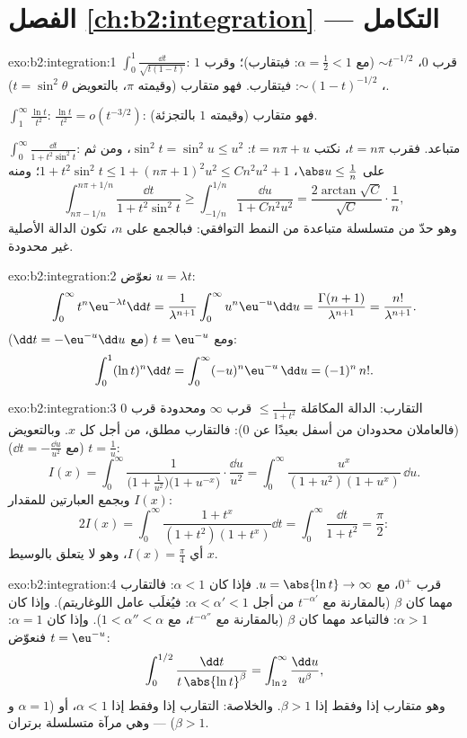 \section*{الفصل \ref{ch:b2:integration} --- التكامل}

\begin{solution}{exo:b2:integration:1}
$\int_0^1 \frac{\dd t}{\sqrt{t(1-t)}}$: قرب $0$، $\sim t^{-1/2}$
(مع $\alpha = \frac12 < 1$: فيتقارب)؛ وقرب $1$، $\sim
(1-t)^{-1/2}$: فيتقارب. فهو متقارب (وقيمته $\pi$،
بالتعويض $t = \sin^2\theta$).

$\int_1^\infty \frac{\ln t}{t^2}$: $\frac{\ln t}{t^2} = o(t^{-3/2})$:
فهو متقارب (وقيمته $1$ بالتجزئة).

$\int_0^\infty \frac{\dd t}{1 + t^2\sin^2 t}$: متباعد. فقرب $t =
n\pi$، نكتب $t = n\pi + u$: $\sin^2 t = \sin^2 u \leq u^2$، ومن ثم على
$\abs u \leq \frac{1}{n}$، $1 + t^2\sin^2 t \leq 1 + (n\pi +
1)^2u^2 \leq C n^2 u^2 + 1$؛ ومنه
\[
\int_{n\pi - 1/n}^{n\pi + 1/n} \frac{\dd t}{1 + t^2\sin^2 t}
\geq \int_{-1/n}^{1/n} \frac{\dd u}{1 + Cn^2u^2}
= \frac{2\arctan\sqrt C}{\sqrt C}\cdot\frac{1}{n} ,
\]
وهو حدّ من متسلسلة متباعدة من النمط التوافقي: فبالجمع على $n$، تكون
الدالة الأصلية غير محدودة.
\end{solution}

\begin{solution}{exo:b2:integration:2}
نعوّض $u = \lambda t$:
\[
\int_0^\infty t^n \eu^{-\lambda t}\dd t
= \frac{1}{\lambda^{n+1}}\int_0^\infty u^n\eu^{-u}\dd u
= \frac{\Gamma(n+1)}{\lambda^{n+1}} = \frac{n!}{\lambda^{n+1}} .
\]
ومع $t = \eu^{-u}$ (مع $\dd t = -\eu^{-u}\dd u$):
\[
\int_0^1 (\ln t)^n \dd t = \int_0^{\infty} (-u)^n \eu^{-u}\,\dd u
= (-1)^n\, n! .
\]
\end{solution}

\begin{solution}{exo:b2:integration:3}
التقارب: الدالة المكامَلة $\leq \frac{1}{1+t^2}$ قرب $\infty$
ومحدودة قرب $0$ (فالعاملان محدودان من أسفل بعيدًا عن $0$):
فالتقارب مطلق، من أجل كل $x$. وبالتعويض $t = \frac1u$
(مع $\dd t = -\frac{\dd u}{u^2}$):
\[
I(x) = \int_0^\infty \frac{1}{\bigl(1 +
\frac1{u^2}\bigr)\bigl(1 + u^{-x}\bigr)}\cdot\frac{\dd u}{u^2}
= \int_0^\infty \frac{u^x}{(1 + u^2)(1 + u^x)}\,\dd u .
\]
وبجمع العبارتين للمقدار $I(x)$:
\[
2I(x) = \int_0^\infty \frac{1 + t^x}{(1+t^2)(1+t^x)}\dd t
= \int_0^\infty \frac{\dd t}{1 + t^2} = \frac{\pi}{2} :
\]
أي $I(x) = \frac\pi4$، وهو لا يتعلق بالوسيط $x$.
\end{solution}

\begin{solution}{exo:b2:integration:4}
قرب $0^+$، مع $u = \abs{\ln t} \to \infty$. فإذا كان $\alpha < 1$:
فالتقارب مهما كان $\beta$ (بالمقارنة مع $t^{-\alpha'}$ من أجل
$\alpha < \alpha' < 1$: فيُغلَب عامل اللوغاريتم). وإذا كان $\alpha > 1$:
فالتباعد مهما كان $\beta$ (بالمقارنة مع $t^{-\alpha''}$،
مع $1 < \alpha'' < \alpha$). وإذا كان $\alpha = 1$: فنعوّض $t =
\eu^{-u}$:
\[
\int_0^{1/2} \frac{\dd t}{t\,\abs{\ln t}^\beta}
= \int_{\ln 2}^{\infty} \frac{\dd u}{u^\beta},
\]
وهو متقارب إذا وفقط إذا $\beta > 1$. والخلاصة: التقارب إذا وفقط إذا $\alpha < 1$،
أو ($\alpha = 1$ و$\beta > 1$) --- وهي مرآة متسلسلة
برتران.
\end{solution}

